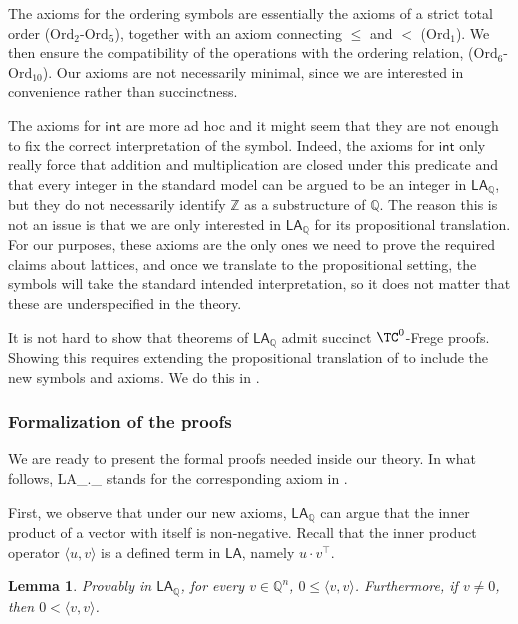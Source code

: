 \documentclass[11pt]{article}
\newcommand{\LA}{\mathsf{LA}}
\newcommand{\LAQ}{\mathsf{LA}_\mathbb{Q}}
\newcommand{\LAint}{\mathsf{int}}
\theoremstyle{definition}
\theoremstyle{plain}
\newtheorem{lemma}[definition]{Lemma}
\theoremstyle{remark}
\newcommand{\bZ}{\mathbb{Z}}
\newcommand{\bQ}{\mathbb{Q}}
\begin{document}
The axioms for the ordering symbols are essentially the axioms of a strict total order ($\text{Ord}_2$-$\text{Ord}_5$), together with an axiom connecting $\leq$ and $<$ ($\text{Ord}_1$). We then ensure the compatibility of the operations with the ordering relation, ($\text{Ord}_6$-$\text{Ord}_{10}$). Our axioms are not necessarily minimal, since we are interested in convenience rather than succinctness. %

The axioms for $\LAint$ are more ad hoc and it might seem that they are not enough to fix the correct interpretation of the symbol. Indeed, the axioms for $\LAint$ only really force that addition and multiplication are closed under this predicate and that every integer in the standard model can be argued to be an integer in $\LAQ$, but they do not necessarily identify $\bZ$ as a substructure of $\bQ$. The reason this is not an issue is that we are only interested in $\LAQ$ for its propositional translation. For our purposes, these axioms are the only ones we need to prove the required claims about lattices, and once we translate to the propositional setting, the symbols will take the standard intended interpretation, so it does not matter that these are underspecified in the theory.

It is not hard to show that theorems of $\LAQ$ admit succinct $\TC^0$-Frege proofs. Showing this requires extending the propositional translation of \citeauthor{cooksoltys} to include the new symbols and axioms. We do this in .

\subsubsection{Formalization of the proofs}
\label{subsubsec:formal-final}
We are ready to present the formal proofs needed inside our theory. In what follows, LA\_.\_ stands for the corresponding axiom in . 

First, we observe that under our new axioms, $\LAQ$ can argue that the inner product of a vector with itself is non-negative. Recall that the inner product operator $\langle u, v \rangle$ is a defined term in $\LA$, namely $u\cdot v^\intercal$.

\begin{lemma}
\label{lemma:inner}
    Provably in $\LAQ$, for every $v\in\bQ^n$, $ 0 \leq \langle v, v \rangle$. Furthermore, if $v \neq 0$, then $0 < \langle v, v \rangle$.
\end{lemma}
\end{document}
